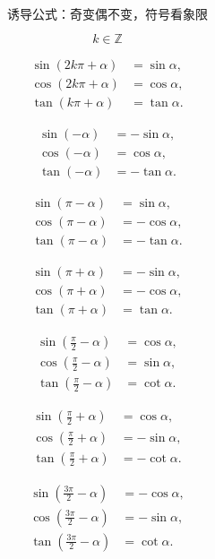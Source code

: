 \[
	\boxed{\text{诱导公式：奇变偶不变，符号看象限}}
\]

\[
	k\in\mathbb{Z}
\]

\[
	\begin{aligned}
		\sin(2k\pi+\alpha) & =\sin\alpha, \\
		\cos(2k\pi+\alpha) & =\cos\alpha, \\
		\tan(k\pi+\alpha)  & =\tan\alpha.
	\end{aligned}
\]

\[
	\begin{aligned}
		\sin(-\alpha) & =-\sin\alpha, \\
		\cos(-\alpha) & =\cos\alpha,  \\
		\tan(-\alpha) & =-\tan\alpha.
	\end{aligned}
\]

\[
	\begin{aligned}
		\sin(\pi-\alpha) & =\sin\alpha,  \\
		\cos(\pi-\alpha) & =-\cos\alpha, \\
		\tan(\pi-\alpha) & =-\tan\alpha.
	\end{aligned}
\]

\[
	\begin{aligned}
		\sin(\pi+\alpha) & =-\sin\alpha, \\
		\cos(\pi+\alpha) & =-\cos\alpha, \\
		\tan(\pi+\alpha) & =\tan\alpha.
	\end{aligned}
\]

\[
	\begin{aligned}
		\sin\left(\frac{\pi}{2}-\alpha\right) & =\cos\alpha, \\
		\cos\left(\frac{\pi}{2}-\alpha\right) & =\sin\alpha, \\
		\tan\left(\frac{\pi}{2}-\alpha\right) & =\cot\alpha.
	\end{aligned}
\]

\[
	\begin{aligned}
		\sin\left(\frac{\pi}{2}+\alpha\right) & =\cos\alpha,  \\
		\cos\left(\frac{\pi}{2}+\alpha\right) & =-\sin\alpha, \\
		\tan\left(\frac{\pi}{2}+\alpha\right) & =-\cot\alpha.
	\end{aligned}
\]

\[
	\begin{aligned}
		\sin\left(\frac{3\pi}{2}-\alpha\right) & =-\cos\alpha, \\
		\cos\left(\frac{3\pi}{2}-\alpha\right) & =-\sin\alpha, \\
		\tan\left(\frac{3\pi}{2}-\alpha\right) & =\cot\alpha.
	\end{aligned}
\]

